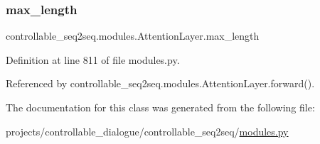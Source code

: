 \mbox{\label{classcontrollable__seq2seq_1_1modules_1_1AttentionLayer_aa9561ae460a709651164167155f0a472}} 
\subsubsection{\texorpdfstring{max\+\_\+length}{max\_length}}
{\footnotesize\ttfamily controllable\+\_\+seq2seq.\+modules.\+Attention\+Layer.\+max\+\_\+length}



Definition at line 811 of file modules.\+py.



Referenced by controllable\+\_\+seq2seq.\+modules.\+Attention\+Layer.\+forward().



The documentation for this class was generated from the following file\+:\begin{DoxyCompactItemize}
\item 
projects/controllable\+\_\+dialogue/controllable\+\_\+seq2seq/\hyperlink{projects_2controllable__dialogue_2controllable__seq2seq_2modules_8py}{modules.\+py}\end{DoxyCompactItemize}
